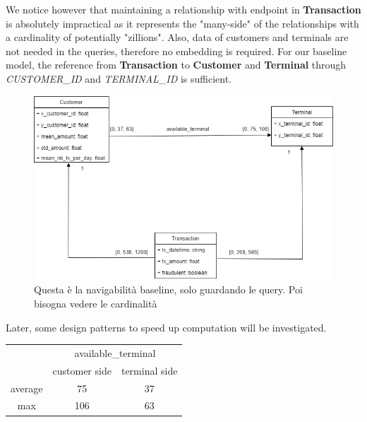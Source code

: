 \documentclass[runningheads]{llncs}
\begin{document}
We notice however that maintaining a relationship with endpoint in \textbf{Transaction} is absolutely impractical as it represents the "many-side" of the relationships with a cardinality of potentially "zillions". Also, data of customers and terminals are not needed in the queries, therefore no embedding is required. For our baseline model, the reference from \textbf{Transaction} to \textbf{Customer} and \textbf{Terminal} through \emph{CUSTOMER\_ID} and \emph{TERMINAL\_ID} is sufficient.
\begin{figure}[!htb] 
        \centering \includegraphics[width=0.9\columnwidth]{images/MongoBaselineNavigability.png}
        \caption{\label{fig3}Questa è la navigabilità baseline, solo guardando le query. Poi bisogna vedere le cardinalità}
\end{figure}
Later, some design patterns to speed up computation will be investigated.
\begin{table}[]
\begin{tabular}{|c|cc|}
\hline
\multirow{2}{*}{} & \multicolumn{2}{c|}{available\_terminal}           \\ \cline{2-3} 
                  & \multicolumn{1}{c|}{customer side} & terminal side \\ \hline
average           & \multicolumn{1}{c|}{75}            & 37            \\ \hline
max               & \multicolumn{1}{c|}{106}           & 63            \\ \hline
\end{tabular}
\end{table}
\end{document}
